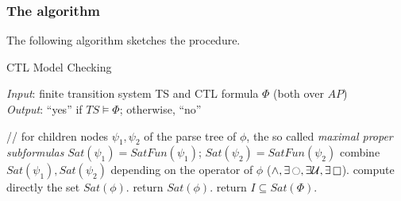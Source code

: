 \documentclass{article}
\begin{document}
\subsubsection{The algorithm}
The following algorithm sketches the procedure. 
\label{subsec-CTLmca}
\begin{algorithm}[H]
    \caption{CTL Model Checking}
    \hspace*{\algorithmicindent} \emph{Input}: finite transition system TS and CTL formula $\Phi$ (both over $AP$) \\
    \hspace*{\algorithmicindent} \emph{Output}: ``yes'' if $TS \vDash \Phi$; otherwise, ``no''
    \begin{algorithmic}[1]
            \State // for children nodes $\psi_1, \psi_2$ of the parse tree of $\phi$, the so called \emph{maximal proper subformulas}
            \State $Sat(\psi_1) = SatFun(\psi_1)$; $Sat(\psi_2) = SatFun(\psi_2)$ 
            \State combine $Sat(\psi_1), Sat(\psi_2)$ depending on the operator of $\phi$ ($\land, \exists\mathop{\ocircle}, \exists\mathbin{\mathcal{U}}, \exists\mathop{\square}$).
        \Else
            \State compute directly the set $Sat(\phi)$.
        \EndIf
        \State return $Sat(\phi)$.
    \EndFunction
    \State return $I \subseteq Sat(\Phi)$.
    \end{algorithmic}
\end{algorithm}
\end{document}

